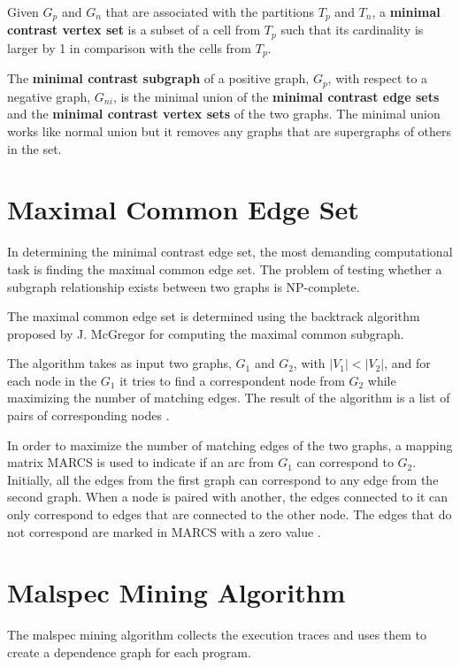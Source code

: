 Given $G_{p}$ and $G_{n}$ that are associated with the partitions $T_{p}$ and $T_{n}$, a \textbf{minimal contrast vertex set} is a subset of a cell from $T_{p}$ such that its cardinality is larger by 1 in comparison with the cells from $T_{p}$.

The \textbf{minimal contrast subgraph} of a positive graph, $G_{p}$, with respect to a negative graph, $G_{ni}$, is the minimal union of the \textbf{minimal contrast edge sets} and the \textbf{minimal contrast vertex sets} of the two graphs. The minimal union works like normal union but it removes any graphs that are supergraphs of others in the set.

\section{Maximal Common Edge Set}
\label{third:maximal-common-edge-set}

In determining the minimal contrast edge set, the most demanding computational task is finding the maximal common edge set. The problem of testing whether a subgraph relationship exists between two graphs is NP-complete.

The maximal common edge set is determined using the backtrack algorithm proposed by J. McGregor for computing the maximal common subgraph.

The algorithm takes as input two graphs, $G_{1}$ and $G_{2}$, with $|V_{1}| < |V_{2}|$, and for each node in the $G_{1}$ it tries to find a correspondent node from $G_{2}$ while maximizing the number of matching edges. The result of the algorithm is a list of pairs of corresponding nodes \cite{common-subgraph}.

In order to maximize the number of matching edges of the two graphs, a mapping matrix MARCS is used to indicate if an arc from $G_{1}$ can correspond to $G_{2}$. Initially, all the edges from the first graph can correspond to any edge from the second graph. When a node is paired with another, the edges connected to it can only correspond to edges that are connected to the other node. The edges that do not correspond are marked in MARCS with a zero value \cite{common-subgraph}.

\section{Malspec Mining Algorithm}
\label{third:malspec-algorithm}	

The malspec mining algorithm collects the execution traces and uses them to create a dependence graph for each program.

